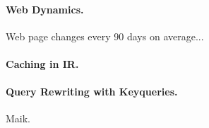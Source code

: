 \paragraph{Web Dynamics.} Web page changes every 90 days on average...

\paragraph{Caching in IR.}


\paragraph{Query Rewriting with Keyqueries.} {\color{red} Maik.}

